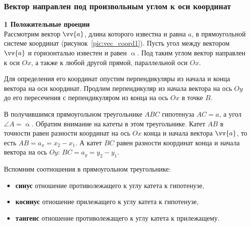 \subsubsection{Вектор направлен под произвольным углом к оси координат}
\textbf{1 Положительные проеции}\\
Рассмотрим вектор $\vv{a}$, длина которого известна и равна $a$,
в прямоугольной системе координат (рисунок~\ref{pic:vec_coord1}).
Пусть угол между вектором $\vv{a}$ и горизонталью известен и равен $\upalpha$.
Под таким углом вектор направлен к оси $Ox$, а также к любой другой прямой,
параллельной оси $Ox$.

Для определения его координат опустим перпендикуляры из начала и конца вектора
на оси координат. Продлим перпендикуляр из начала вектора на ось $Oy$ до его пересечения
с перпендикуляром из конца на ось $Ox$ в точке $B$.

В получившимся прямоугольном треугольнике $ABC$ гипотенуза $AC = a$, а угол $\angle A = \upalpha$.
Обратим внимание на катеты в этом треугольнике.
Катет $AB$ в точности равен разности координат на ось $Ox$ конца и начала вектора $\vv{a}$, то есть
$AB = a_x = x_2-x_1$. А катет $BC$ равен разности координат
конца и начала вектора на ось $Oy$: $BC = a_y = y_2-y_1$.

Вспомним соотношения в прямоугольном треугольнике:
\begin{itemize}
\item \textbf{синус} \bdash отношение противолежащего к углу катета к гипотенузе,
\item \textbf{косинус} \bdash отношение прилежащего к углу катета к гипотенузе,
\item \textbf{тангенс} \bdash отношение противолежащего к углу катета к прилежащему.
\end{itemize}

